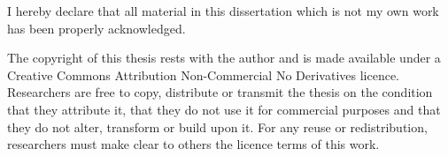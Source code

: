 {\thispagestyle{empty}

\null

\vfill


\medskip

\noindent I hereby declare that all material in this dissertation which is not my own work has been properly acknowledged.

\vspace*{2cm}


\medskip

\noindent The copyright of this thesis rests with the author and is made available under a Creative Commons Attribution Non-Commercial No Derivatives licence. Researchers are free to copy, distribute or transmit the thesis on the condition that they attribute it, that they do not use it for commercial purposes and that they do not alter, transform or build upon it. For any reuse or redistribution, researchers must make clear to others the licence terms of this work.
}